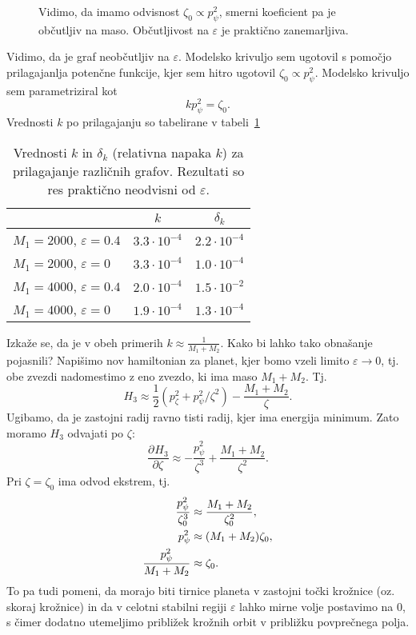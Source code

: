 \documentclass[12pt, a4paper]{article}
\newcommand{\der}[3][]{
    \ensuremath{ \frac{\partial^{#1} #2}{\partial #3^{#1}} }
}
\begin{document}
\begin{figure}[H]\centering
	
	\caption{Vidimo, da imamo odvisnost $\zeta_0 \propto p_\psi^2$, smerni koeficient pa je ob\v cutljiv na maso.
		Ob\v cutljivost na $\varepsilon$ je prakti\v cno zanemarljiva.}
	\label{fig:zastoj2}
\end{figure}
Vidimo, da je graf neob\v cutljiv na $\varepsilon$. Modelsko krivuljo sem ugotovil s pomo\v cjo prilagajanlja poten\v cne
funkcije, kjer sem hitro ugotovil $\zeta_0 \propto p_\psi^2$. Modelsko krivuljo sem parametriziral kot
\begin{equation}
	kp_\psi^2 = \zeta_0.
\end{equation}
Vrednosti $k$ po prilagajanju so tabelirane v tabeli~\ref{tab:fit1}
\begin{table}[H]\centering
	\caption{Vrednosti $k$ in $\delta_k$ (relativna napaka $k$) za prilagajanje razli\v cnih grafov. Rezultati
		so res prakti\v cno neodvisni od $\varepsilon$.}
	\begin{tabular}{l|c|c}
		& $k$ & $\delta_k$ \\
		\hline \hline
		$M_1 = 2000$, $\varepsilon = 0.4$ & $3.3\cdot10^{-4}$ & $2.2\cdot10^{-4}$ \\
		$M_1 = 2000$, $\varepsilon = 0$   & $3.3\cdot10^{-4}$ & $1.0\cdot10^{-4}$ \\
		\hline
		$M_1 = 4000$, $\varepsilon = 0.4$ & $2.0\cdot10^{-4}$ & $1.5\cdot10^{-2}$ \\
		$M_1 = 4000$, $\varepsilon = 0$   & $1.9\cdot10^{-4}$ & $1.3\cdot10^{-4}$
	\end{tabular}
	\label{tab:fit1}
\end{table}
Izka\v ze se, da je v obeh primerih $k \approx \frac{1}{M_1 + M_2}$. Kako bi lahko tako obna\v sanje pojasnili? Napi\v simo
nov hamiltonian za planet, kjer bomo vzeli limito $\varepsilon \to 0$, tj. obe zvezdi nadomestimo z eno zvezdo, ki
ima maso $M_1 + M_2$. Tj.
\begin{equation}
	H_3 \approx \frac{1}{2}(p_\zeta^2 + p_\psi^2/\zeta^2) - \frac{M_1 + M_2}{\zeta}.
\end{equation}
Ugibamo, da je zastojni radij ravno tisti radij, kjer ima energija minimum. Zato moramo $H_3$ odvajati po $\zeta$:
\begin{equation}
	\der{H_3}{\zeta} \approx -\frac{p_\psi^2}{\zeta^3} + \frac{M_1 + M_2}{\zeta^2}.
\end{equation}
Pri $\zeta = \zeta_0$ ima odvod ekstrem, tj.
\begin{align}
	\frac{p_\psi^2}{\zeta_0^3} &\approx \frac{M_1 + M_2}{\zeta_0^2}, \notag \\
	p_\psi^2 &\approx (M_1 + M_2)\zeta_0, \notag \\
	\frac{p_\psi^2}{M_1 + M_2} &\approx \zeta_0.
\end{align}
To pa tudi pomeni, da morajo biti tirnice planeta v zastojni to\v cki kro\v znice (oz. skoraj kro\v znice) in da v
celotni stabilni regiji $\varepsilon$ lahko mirne volje postavimo na 0, s \v cimer dodatno utemeljimo pribli\v zek
kro\v znih orbit v pribli\v zku povpre\v cnega polja.
\end{document}
